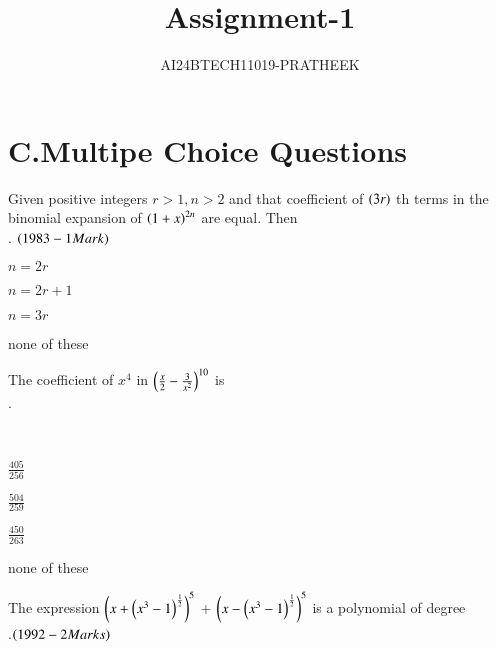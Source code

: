 \documentclass[journal,12pt,twocolumn]{IEEEtran}
\theoremstyle{remark}
\begin{document}

\vspace{3cm}

\title{Assignment-1}
\author{AI24BTECH11019-PRATHEEK}
\maketitle
\newpage
\bigskip

\renewcommand{\thefigure}{\theenumi}
\renewcommand{\thetable}{\theenumi}

\section*{\textbf{C.Multipe Choice Questions}}
\begin{enumerate}

\item   Given positive integers $r>1,n>2$ and that {coefficient} of $\left(3r\right)$ th terms in the binomial expansion of $\left(1+x\right)^{2n}$ are equal. Then\\.
$\hfill(1983-1Mark)$ \\
\begin{enumerate}[label =(\alph*)]
\begin{multicols}{2}
\item $n=2r$
\item $n=2r+1$
\item $n=3r$
\item none of these
\end{multicols}
\end{enumerate}
\item The coefficient of $x^4$ in $\left(\frac{x}{2}-\frac{3}{x^2}\right)^{10}$ is\\ .\hfill{\textit{}\\ 
\begin{enumerate}[label =(\alph*)]
\begin{multicols}{2}
\item $\frac{405}{256}$
\item $\frac{504}{259}$
\item $\frac{450}{263}$
\item none of these
\end{multicols}
\end{enumerate}
\item The expression $\left(x+\left(x^3-1\right)^{\frac{1}{2}}\right)^5$ + $\left(x-\left(x^3-1\right)^{\frac{1}{2}}\right)^5$ is a polynomial of degree \\
.\hfill{$\left(1992-2Marks\right)$}
\begin{enumerate}[label=(\alph*)]
\begin{multicols}{2}
    


\end{multicols}
\end{enumerate}}
\end{enumerate}
\end{document}
